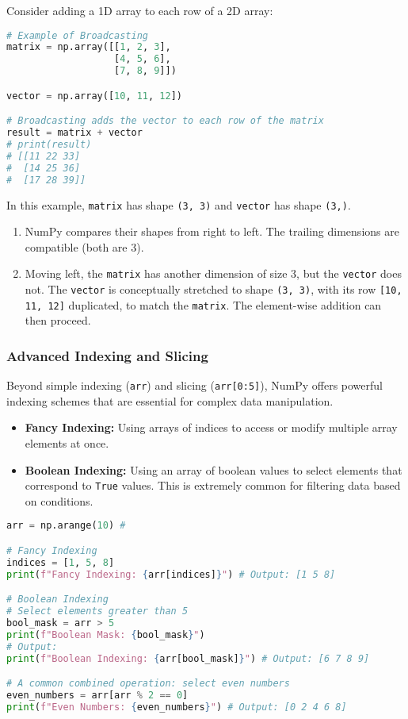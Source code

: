 \documentclass[11pt,a4paper]{article}
\begin{document}
Consider adding a 1D array to each row of a 2D array:

\begin{lstlisting}[language=Python]
# Example of Broadcasting
matrix = np.array([[1, 2, 3],
                   [4, 5, 6],
                   [7, 8, 9]])

vector = np.array([10, 11, 12])

# Broadcasting adds the vector to each row of the matrix
result = matrix + vector
# print(result)
# [[11 22 33]
#  [14 25 36]
#  [17 28 39]]
\end{lstlisting}

In this example, \texttt{matrix} has shape \texttt{(3, 3)} and \texttt{vector} has shape \texttt{(3,)}.
\begin{enumerate}
    \item NumPy compares their shapes from right to left. The trailing dimensions are compatible (both are 3).
    \item Moving left, the \texttt{matrix} has another dimension of size 3, but the \texttt{vector} does not. The \texttt{vector} is conceptually stretched to shape \texttt{(3, 3)}, with its row \texttt{[10, 11, 12]} duplicated, to match the \texttt{matrix}. The element-wise addition can then proceed.
\end{enumerate}

\subsubsection{Advanced Indexing and Slicing}

Beyond simple indexing (\texttt{arr}) and slicing (\texttt{arr[0:5]}), NumPy offers powerful indexing schemes that are essential for complex data manipulation.
\begin{itemize}
    \item \textbf{Fancy Indexing:} Using arrays of indices to access or modify multiple array elements at once.
    \item \textbf{Boolean Indexing:} Using an array of boolean values to select elements that correspond to \texttt{True} values. This is extremely common for filtering data based on conditions.
\end{itemize}

\begin{lstlisting}[language=Python]
arr = np.arange(10) # 

# Fancy Indexing
indices = [1, 5, 8]
print(f"Fancy Indexing: {arr[indices]}") # Output: [1 5 8]

# Boolean Indexing
# Select elements greater than 5
bool_mask = arr > 5
print(f"Boolean Mask: {bool_mask}") 
# Output:
print(f"Boolean Indexing: {arr[bool_mask]}") # Output: [6 7 8 9]

# A common combined operation: select even numbers
even_numbers = arr[arr % 2 == 0]
print(f"Even Numbers: {even_numbers}") # Output: [0 2 4 6 8]
\end{lstlisting}
\end{document}
